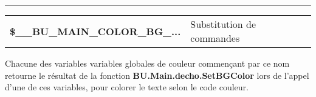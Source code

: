 \documentclass[a4paper,10pt]{article}
\begin{document}

\par\noindent\rule{\textwidth}{0.4pt}

\begin{justify}
    \begin{tabular}{l|l}
        \textbf{\color{vars}\$\_\_BU\_MAIN\_COLOR\_BG\_...} & Substitution de commandes\\
    \end{tabular}
\end{justify}

\begin{justify}
    Chacune des variables variables globales de couleur commençant par ce nom retourne le résultat de la fonction \textbf{\color{func}BU.Main.decho.SetBGColor} lors de l'appel d'une de ces variables, pour colorer le texte selon le code couleur.
\end{justify}
\end{document}
